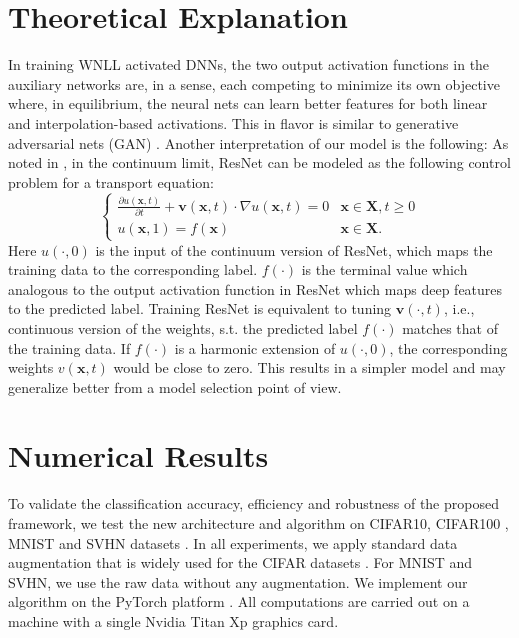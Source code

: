 \documentclass{article}
\begin{document}
\section{Theoretical Explanation}
\label{sec:Theory}
In training WNLL activated DNNs, the two output activation functions in the auxiliary networks are, in a sense, each competing to minimize its own objective where, in equilibrium, the neural nets can learn better features for both linear and interpolation-based activations. This in flavor is similar to generative adversarial nets (GAN) \cite{GAN}.
Another interpretation of our model is the following: As noted in  \cite{ResNet:PDE}, in the continuum limit, ResNet can be modeled as the following control problem for a transport equation:
\begin{equation}
\label{Linear-Transport}
\begin{cases}
\frac{\partial u(\mathbf{x}, t)}{\partial t}+\mathbf{v}(\mathbf{x}, t)\cdot \nabla u(\mathbf{x}, t)=0 & \mathbf{x}\in \mathbf{X}, t\geq 0\\
u(\mathbf{x}, 1)=f\left(\mathbf{x}\right) &\mathbf{x}\in \mathbf{X}.
\end{cases}
\end{equation}
Here $u(\cdot, 0)$ is the input of the continuum version of ResNet, which maps the training data to the corresponding label. $f(\cdot)$ is the terminal value which analogous to the output activation function in ResNet which maps deep features to the predicted label. Training ResNet is equivalent to tuning $\mathbf{v}(\cdot, t)$, i.e., continuous version of the weights, s.t. the predicted label $f(\cdot)$ matches that of the training data. If $f(\cdot)$ is a harmonic extension of $u(\cdot, 0)$, the corresponding weights $v(\mathbf{x}, t)$ would be close to zero. This results in a simpler model and may generalize better from a model selection point of view.








\section{Numerical Results} \label{Experiments}
To validate the classification accuracy, efficiency and robustness of the proposed framework, we test the new architecture and algorithm on CIFAR10, CIFAR100 \cite{Cifar:2009}, MNIST\cite{MNIST:1998} and SVHN datasets \cite{SVHN:2011}.
In all experiments, we apply standard data augmentation that is widely used for the CIFAR datasets \cite{DRN:2016,Huang:2017CVPR,Zagoruyko:2016}. For MNIST and SVHN, we use the raw data without any augmentation. We implement our algorithm on the PyTorch platform \cite{paszke2017automatic}. All computations are carried out on a machine with a single Nvidia Titan Xp graphics card.
\end{document}
